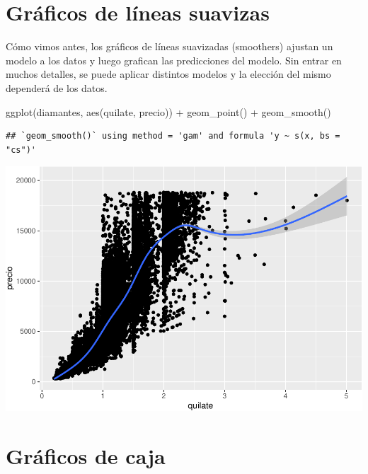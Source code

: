 \documentclass[
  openany]{book}
\newenvironment{Shaded}{\begin{snugshade}}{\end{snugshade}}
\newcommand{\FunctionTok}[1]{\textcolor[rgb]{0.00,0.00,0.00}{#1}}
\newcommand{\NormalTok}[1]{#1}
\newcommand{\SpecialCharTok}[1]{\textcolor[rgb]{0.00,0.00,0.00}{#1}}
\begin{document}
\hypertarget{gruxe1ficos-de-luxedneas-suavizas}{%
\section{Gráficos de líneas suavizas}\label{gruxe1ficos-de-luxedneas-suavizas}}

Cómo vimos antes, los gráficos de líneas suavizadas (smoothers) ajustan un modelo a los datos y luego grafican las predicciones del modelo.
Sin entrar en muchos detalles, se puede aplicar distintos modelos y la elección del mismo dependerá de los datos.

\begin{Shaded}
\begin{Highlighting}[]
\FunctionTok{ggplot}\NormalTok{(diamantes, }\FunctionTok{aes}\NormalTok{(quilate, precio)) }\SpecialCharTok{+}
  \FunctionTok{geom\_point}\NormalTok{() }\SpecialCharTok{+}
  \FunctionTok{geom\_smooth}\NormalTok{()}
\end{Highlighting}
\end{Shaded}

\begin{verbatim}
## `geom_smooth()` using method = 'gam' and formula 'y ~ s(x, bs = "cs")'
\end{verbatim}

\begin{center}\includegraphics[width=1\linewidth]{DT6_files/figure-latex/unnamed-chunk-67-1} \end{center}

\hypertarget{gruxe1ficos-de-caja}{%
\section{Gráficos de caja}\label{gruxe1ficos-de-caja}}
\end{document}
